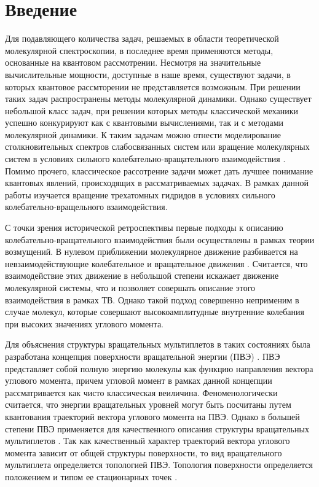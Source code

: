 \section{Введение}

\vpravo Для подавляющего количества задач, решаемых в области теоретической молекулярной спектроскопии, в последнее время применяются методы, основанные на квантовом рассмотрении. Несмотря на значительные вычислительные мощности, доступные в наше время, существуют задачи, в которых квантовое рассмторении не представляется возможным. При решении таких задач распространены методы молекулярной динамики. Однако существует небольшой класс задач, при решении которых методы классической механики успешно конкурируют как с квантовыми вычислениями, так и с методами молекулярной динамики. К таким задачам можно отнести моделирование столкновительных спектров слабосвязанных систем \cite{lok2004} или вращение молекулярных систем в условиях сильного колебательно-вращательного взаимодействия \cite{petrov2015}. Помимо прочего, классическое рассотрение задачи может дать лучшее понимание квантовых явлений, происходящих в рассматриваемых задачах. В рамках данной работы изучается вращение трехатомных гидридов в условиях сильного колебательно-вращельного взаимодействия. \par
С точки зрения исторической ретроспективы первые подходы к описанию колебательно-вращательного взаимодействия были осуществлены в рамках теории возмущений. В нулевом приближении молекулярное движение разбивается на невзаимодействующие колебательное и вращательное движения \cite{tyu1992}. Считается, что взаимодействие этих движение в небольшой степени искажает движение молекулярной системы, что и позволяет совершать описание этого взаимодействия в рамках ТВ. Однако такой подход совершенно неприменим в случае молекул, которые совершают высокоамплитудные внутренние колебания при высоких значениях углового момента. \par
Для объяснения структуры вращательных мультиплетов в таких состояниях была разработана концепция поверхности вращательной энергии (ПВЭ) \cite{har1984, king1947}. ПВЭ представляет собой полную энергию молекулы как функцию направления вектора углового момента, причем угловой момент в рамках данной концепции рассматривается как чисто классическая веиличина. Феноменологически считается, что энергии вращательных уровней могут быть посчитаны путем квантования траекторий вектора углового момента на ПВЭ. Однако в большей степени ПВЭ применяется для качественного описания структуры вращательных мультиплетов \cite{makar1998}. Так как качественный характер траекторий вектора углового момента зависит от общей структуры поверхности, то вид вращательного мультиплета определяется топологией ПВЭ. Топология поверхности определяется положением и типом ее стационарных точек \cite{pav1985, pav1987}. \par
